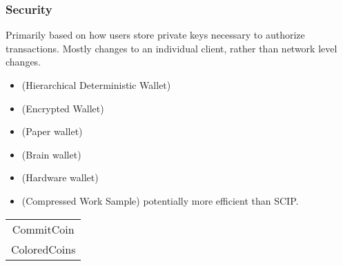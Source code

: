 \subsubsection{Security}
Primarily based on how users store private keys necessary to authorize transactions. Mostly changes to an individual client, rather than network level changes.
\begin{itemize}
\item (Hierarchical Deterministic Wallet)
\item (Encrypted Wallet)
\item (Paper wallet)
\item (Brain wallet)
\item (Hardware wallet)
\item (Compressed Work Sample) potentially more efficient than SCIP.
\end{itemize}


\begin{table}
\begin{tabular}{c}
CommitCoin \\
ColoredCoins \\
\end{tabular}
\end{table}
